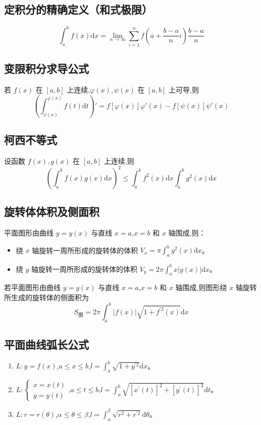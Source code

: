 \documentclass[UTF8]{ctexart}
\theoremstyle{remark}
\begin{document}
		\subsection{定积分的精确定义（和式极限）}
		\[
		\int_{a}^{b} f(x)\mathrm{d}x = \lim_{n \to \infty} \sum_{i = 1}^{n} f\left(a + \frac{b - a}{n}i\right)\frac{b - a}{n}
		\]
		
		\subsection{变限积分求导公式}
		若 \(f(x)\) 在 \([a, b]\) 上连续,\(\varphi(x), \psi(x)\) 在 \([a, b]\) 上可导,则
		\[
		\left(\int_{\psi(x)}^{\varphi(x)} f(t)\mathrm{d}t\right)' = f[\varphi(x)]\varphi'(x) - f[\psi(x)]\psi'(x)
		\]
		
		\subsection{柯西不等式}
		设函数 \(f(x), g(x)\) 在 \([a, b]\) 上连续,则
		\[
		\left(\int_{a}^{b} f(x)g(x)\mathrm{d}x\right)^{2} \leq \int_{a}^{b} f^{2}(x)\mathrm{d}x \int_{a}^{b} g^{2}(x)\mathrm{d}x
		\]
		
		\subsection{旋转体体积及侧面积}
		平面图形由曲线 \(y = y(x)\) 与直线 \(x = a\),\(x = b\) 和 \(x\) 轴围成,则：
		\begin{itemize}
			\item 绕 \(x\) 轴旋转一周所形成的旋转体的体积 \(V_x=\pi\int_{a}^{b} y^{2}(x)\mathrm{d}x\)。
			\item 绕 \(y\) 轴旋转一周所形成的旋转体的体积 \(V_y = 2\pi\int_{a}^{b} x|y(x)|\mathrm{d}x\)。
		\end{itemize}
		若平面图形由曲线 \(y = y(x)\) 与直线 \(x = a\),\(x = b\) 和 \(x\) 轴围成,则图形绕 \(x\) 轴旋转所生成的旋转体的侧面积为
		\[
		S_{侧}=2\pi\int_{a}^{b} |f(x)|\sqrt{1 + f^{\prime 2}(x)}\mathrm{d}x
		\]
		
		
		\subsection{平面曲线弧长公式}
		\begin{enumerate}
			\item \(L:y = f(x)\),\(a\leq x\leq b\),\(l=\int_{a}^{b}\sqrt{1 + y^{\prime 2}}\mathrm{d}x\)。
			\item \(L:\begin{cases}x = x(t)\\y = y(t)\end{cases}\),\(a\leq t\leq b\),\(l=\int_{a}^{b}\sqrt{[x^{\prime}(t)]^{2}+[y^{\prime}(t)]^{2}}\mathrm{d}t\)。
			\item \(L:r = r(\theta)\),\(\alpha\leq\theta\leq\beta\),\(l=\int_{\alpha}^{\beta}\sqrt{r^{2}+r^{\prime 2}}\mathrm{d}\theta\)。
		\end{enumerate}
		
\end{document}
